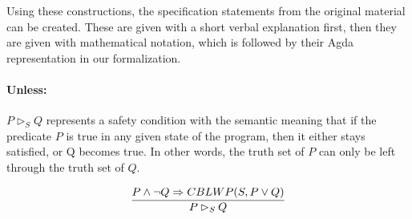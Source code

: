 



Using these constructions, the specification statements from the original material can be created. These are given with a short verbal explanation first, then they are given with mathematical notation, which is followed by their Agda representation in our formalization.


\paragraph{Unless:}
$P \rhd_S Q$ represents a safety condition with the semantic meaning that if the predicate $P$ is true in any given state of the program, then it either stays satisfied, or Q becomes true. In other words, the truth set of $P$ can only be left through the truth set of $Q$.

\begin{equation}
    \label{eq:unless}
    \infer{P \rhd_S Q}{P \land \neg Q \Rightarrow CBLWP(S, P \lor Q)}
\end{equation}

